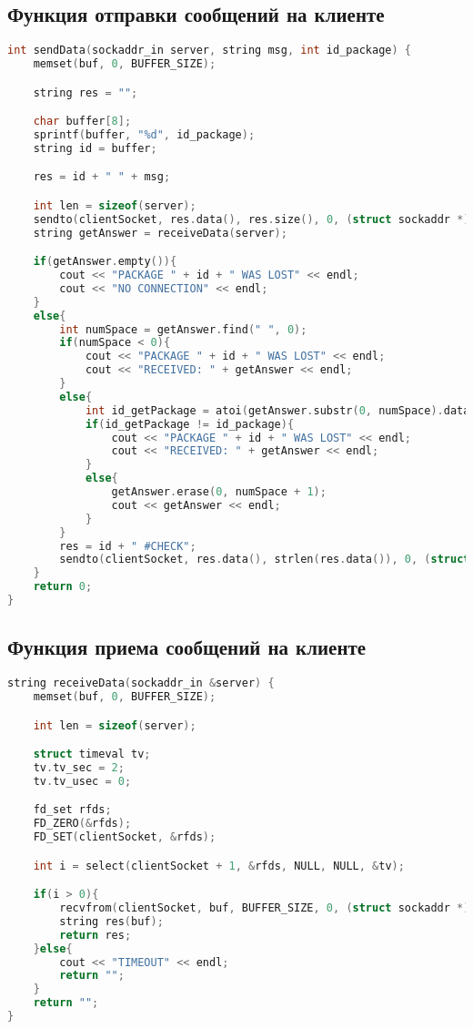\begin{append}
\subsection{Функция отправки сообщений на клиенте} \label{app:sendudp}

\begin{lstlisting}[language=C, label=lst:createserver]
int sendData(sockaddr_in server, string msg, int id_package) {
    memset(buf, 0, BUFFER_SIZE);

    string res = "";

    char buffer[8];
    sprintf(buffer, "%d", id_package);
    string id = buffer;

    res = id + " " + msg;

    int len = sizeof(server);
    sendto(clientSocket, res.data(), res.size(), 0, (struct sockaddr *) &server, len);
    string getAnswer = receiveData(server);

    if(getAnswer.empty()){
        cout << "PACKAGE " + id + " WAS LOST" << endl;
        cout << "NO CONNECTION" << endl;
    }
    else{
        int numSpace = getAnswer.find(" ", 0);
        if(numSpace < 0){
            cout << "PACKAGE " + id + " WAS LOST" << endl;
            cout << "RECEIVED: " + getAnswer << endl;
        }
        else{
            int id_getPackage = atoi(getAnswer.substr(0, numSpace).data());
            if(id_getPackage != id_package){
                cout << "PACKAGE " + id + " WAS LOST" << endl;
                cout << "RECEIVED: " + getAnswer << endl;
            }
            else{
                getAnswer.erase(0, numSpace + 1);
                cout << getAnswer << endl;
            }
        }
        res = id + " #CHECK";
        sendto(clientSocket, res.data(), strlen(res.data()), 0, (struct sockaddr *) &server, len);
    }
    return 0;
}
\end{lstlisting}

\subsection{Функция приема сообщений на клиенте} \label{app:recvudp}

\begin{lstlisting}[language=C, label=lst:createserver]
string receiveData(sockaddr_in &server) {
    memset(buf, 0, BUFFER_SIZE);

    int len = sizeof(server);

    struct timeval tv;
    tv.tv_sec = 2;
    tv.tv_usec = 0;

    fd_set rfds;
    FD_ZERO(&rfds);
    FD_SET(clientSocket, &rfds);

    int i = select(clientSocket + 1, &rfds, NULL, NULL, &tv);

    if(i > 0){
        recvfrom(clientSocket, buf, BUFFER_SIZE, 0, (struct sockaddr *) &server, &len);
        string res(buf);
        return res;
    }else{
        cout << "TIMEOUT" << endl;
        return "";
    }
    return "";
}
\end{lstlisting}


\end{append}